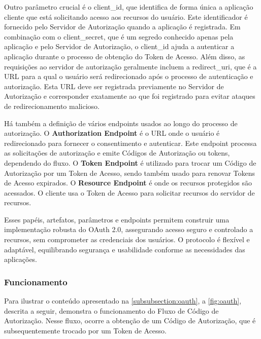 Outro parâmetro crucial é o client\_id, que identifica de forma única a aplicação cliente que está solicitando acesso aos recursos do usuário. Este identificador é fornecido pelo Servidor de Autorização quando a aplicação é registrada. Em combinação com o client\_secret, que é um segredo conhecido apenas pela aplicação e pelo Servidor de Autorização, o client\_id ajuda a autenticar a aplicação durante o processo de obtenção do Token de Acesso. Além disso, as requisições ao servidor de autorização geralmente incluem a redirect\_uri, que é a URL para a qual o usuário será redirecionado após o processo de autenticação e autorização. Esta URL deve ser registrada previamente no Servidor de Autorização e corresponder exatamente ao que foi registrado para evitar ataques de redirecionamento malicioso.

Há também a definição de vários endpoints usados ao longo do processo de autorização. O \textbf{Authorization Endpoint} é o URL onde o usuário é redirecionado para fornecer o consentimento e autenticar. Este endpoint processa as solicitações de autorização e emite Códigos de Autorização ou tokens, dependendo do fluxo. O \textbf{Token Endpoint} é utilizado para trocar um Código de Autorização por um Token de Acesso, sendo também usado para renovar Tokens de Acesso expirados. O \textbf{Resource Endpoint} é onde os recursos protegidos são acessados. O cliente usa o Token de Acesso para solicitar recursos do servidor de recursos.

Esses papéis, artefatos, parâmetros e endpoints permitem construir uma implementação robusta do OAuth 2.0, assegurando acesso seguro e controlado a recursos, sem comprometer as credenciais dos usuários. O protocolo é flexível e adaptável, equilibrando segurança e usabilidade conforme as necessidades das aplicações.


\subsubsection{Funcionamento}\label{subsubsection:funcionamento-oauth}

Para ilustrar o conteúdo apresentado na \autoref{subsubsection:oauth}, a \autoref{fig:oauth}, descrita a seguir, demonstra o funcionamento do Fluxo de Código de Autorização. Nesse fluxo, ocorre a obtenção de um Código de Autorização, que é subsequentemente trocado por um Token de Acesso.



